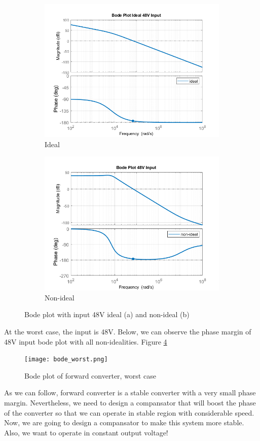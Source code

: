 \begin{figure}[H]
\centering
\begin{subfigure}{7 cm}
  \centering
  \includegraphics[width=7 cm]{Figs/bode_48_ideal.png}
  \caption{Ideal}
  \label{fig:bode_48}
\end{subfigure}%
\begin{subfigure}{7 cm}
  \centering
  \includegraphics[width=7 cm]{Figs/bode_48_non.png}
  \caption{Non-ideal}
  \label{fig:bode_non_48}
\end{subfigure}
\caption{Bode plot with input 48V ideal (a) and non-ideal (b)}
\label{fig:bode48}
\end{figure}


At the worst case, the input is 48V. Below, we can observe the phase margin of 48V input bode plot with all non-idealities. Figure \ref{bode_big_48}

\begin{center}
\begin{figure}[H]
\centering
\texttt{[image: bode\_worst.png]}
\caption{Bode plot of forward converter, worst case}
\label{bode_big_48}
\end{figure}
\end{center}

As we can follow, forward converter is a stable converter with a very small phase margin. Nevertheless, we need to design a compansator that will boost the phase of the converter so that we can operate in stable region with considerable speed. Now, we are going to design a compansator to make this system more stable. Also, we want to operate in constant output voltage!

